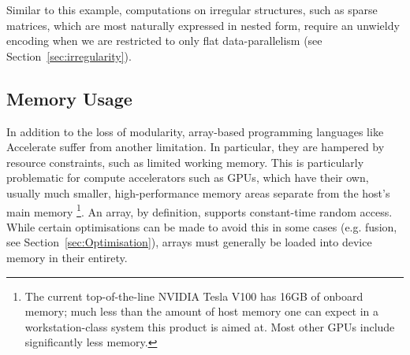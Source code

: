 Similar to this example, computations on irregular structures, such as sparse matrices, which are most naturally expressed in nested form, require an unwieldy encoding when we are restricted to only flat data-parallelism (see Section~\ref{sec:irregularity}).




%
%
%

\subsection{Memory Usage}
\label{sec:problem_2}

In addition to the loss of modularity, array-based programming languages like Accelerate suffer from another limitation. In particular, they are hampered by resource constraints, such as limited working memory. This is particularly problematic for compute accelerators such as GPUs, which have their own, usually much smaller, high-performance memory areas separate from the host's main memory%
\footnote{The current top-of-the-line NVIDIA Tesla V100 has 16GB of onboard
memory; much less than the amount of host memory one can expect in a
workstation-class system this product is aimed at. Most other GPUs include significantly less memory.}.
An array, by definition, supports constant-time random access. While certain optimisations can be made to avoid this in some cases (e.g. fusion, see Section~\ref{sec:Optimisation}), arrays must generally be loaded into device memory in their entirety.

